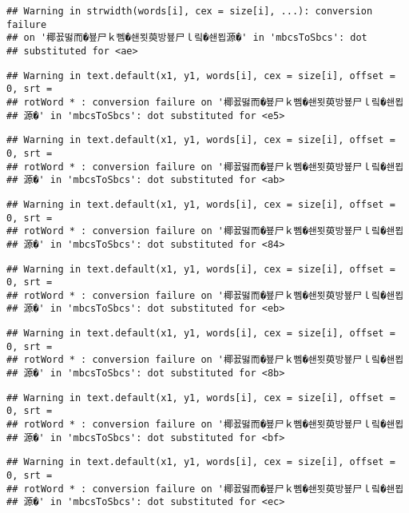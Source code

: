 \documentclass[]{article}
\begin{document}
\begin{verbatim}
## Warning in strwidth(words[i], cex = size[i], ...): conversion failure
## on '椰꾨떯而�뵾尸ｋ뻼�쇈묏萸방뵾尸ｌ맄�쇈묍源�' in 'mbcsToSbcs': dot
## substituted for <ae>
\end{verbatim}

\begin{verbatim}
## Warning in text.default(x1, y1, words[i], cex = size[i], offset = 0, srt =
## rotWord * : conversion failure on '椰꾨떯而�뵾尸ｋ뻼�쇈묏萸방뵾尸ｌ맄�쇈묍
## 源�' in 'mbcsToSbcs': dot substituted for <e5>
\end{verbatim}

\begin{verbatim}
## Warning in text.default(x1, y1, words[i], cex = size[i], offset = 0, srt =
## rotWord * : conversion failure on '椰꾨떯而�뵾尸ｋ뻼�쇈묏萸방뵾尸ｌ맄�쇈묍
## 源�' in 'mbcsToSbcs': dot substituted for <ab>
\end{verbatim}

\begin{verbatim}
## Warning in text.default(x1, y1, words[i], cex = size[i], offset = 0, srt =
## rotWord * : conversion failure on '椰꾨떯而�뵾尸ｋ뻼�쇈묏萸방뵾尸ｌ맄�쇈묍
## 源�' in 'mbcsToSbcs': dot substituted for <84>
\end{verbatim}

\begin{verbatim}
## Warning in text.default(x1, y1, words[i], cex = size[i], offset = 0, srt =
## rotWord * : conversion failure on '椰꾨떯而�뵾尸ｋ뻼�쇈묏萸방뵾尸ｌ맄�쇈묍
## 源�' in 'mbcsToSbcs': dot substituted for <eb>
\end{verbatim}

\begin{verbatim}
## Warning in text.default(x1, y1, words[i], cex = size[i], offset = 0, srt =
## rotWord * : conversion failure on '椰꾨떯而�뵾尸ｋ뻼�쇈묏萸방뵾尸ｌ맄�쇈묍
## 源�' in 'mbcsToSbcs': dot substituted for <8b>
\end{verbatim}

\begin{verbatim}
## Warning in text.default(x1, y1, words[i], cex = size[i], offset = 0, srt =
## rotWord * : conversion failure on '椰꾨떯而�뵾尸ｋ뻼�쇈묏萸방뵾尸ｌ맄�쇈묍
## 源�' in 'mbcsToSbcs': dot substituted for <bf>
\end{verbatim}

\begin{verbatim}
## Warning in text.default(x1, y1, words[i], cex = size[i], offset = 0, srt =
## rotWord * : conversion failure on '椰꾨떯而�뵾尸ｋ뻼�쇈묏萸방뵾尸ｌ맄�쇈묍
## 源�' in 'mbcsToSbcs': dot substituted for <ec>
\end{verbatim}
\end{document}
